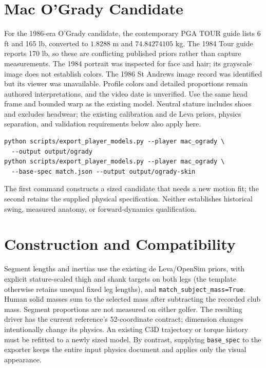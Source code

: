 \documentclass{article}
\begin{document}
\section{Mac O'Grady Candidate}
For the 1986-era O'Grady candidate, the contemporary PGA TOUR guide lists
6 ft and 165 lb, converted to $1.8288$ m and $74.84274105$ kg. The 1984
Tour guide reports 170 lb, so these are conflicting published priors rather
than capture measurements. The 1984 portrait was inspected for face and hair;
its grayscale image does not establish colors. The 1986 St Andrews image record
was identified but its viewer was unavailable. Profile colors and detailed
proportions remain authored interpretations, and the video date is unverified.
Use the same head frame and bounded warp as the existing model. Neutral stature
includes shoes and excludes headwear; the existing calibration and de Leva
priors, physics separation, and validation requirements below also apply here.
\begin{verbatim}
python scripts/export_player_models.py --player mac_ogrady \
  --output output/ogrady
python scripts/export_player_models.py --player mac_ogrady \
  --base-spec match.json --output output/ogrady-skin
\end{verbatim}
The first command constructs a sized candidate that needs a new motion fit;
the second retains the supplied physical specification. Neither establishes
historical swing, measured anatomy, or forward-dynamics qualification.
\section{Construction and Compatibility}
Segment lengths and inertias use the existing de Leva/OpenSim priors, with
explicit stature-scaled thigh and shank targets on both legs (the template
otherwise retains unequal fixed leg lengths), and
\texttt{match\_subject\_mass=True}. Human solid masses sum to the selected
mass after subtracting the recorded club mass. Segment proportions are not
measured on either golfer. The resulting driver has the current reference's
52-coordinate contract; dimension changes intentionally change its physics.
An existing C3D trajectory or torque history must be refitted to a newly sized
model. By contrast, supplying \texttt{base\_spec} to the exporter keeps the
entire input physics document and applies only the visual appearance.
\end{document}
